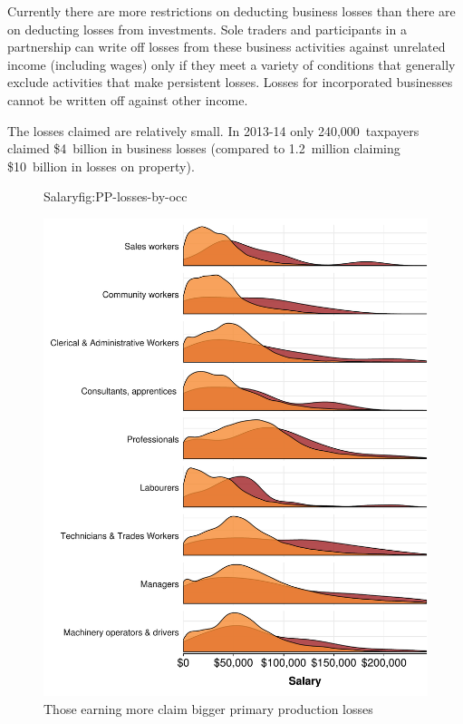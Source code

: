 \documentclass{grattan}\usepackage[]{graphicx}\usepackage[]{color}
\begin{document}
Currently there are more restrictions on deducting business losses than there are on deducting losses from investments. Sole traders and participants in a partnership can write off losses from these business activities against unrelated income (including wages) only if they meet a variety of conditions that generally exclude activities that make persistent losses.  Losses for incorporated businesses cannot be written off against other income. 





The losses claimed are relatively small. In 2013-14 only 240,000~taxpayers claimed \$4~billion in business losses (compared to 1.2~million claiming \$10~billion in losses on property).

\TBD{\dots}



\begin{figure}
\caption{Those earning more claim bigger primary production losses}{Salary}{fig:PP-losses-by-occ}










\includegraphics[width=\columnwidth]{CGT-NG-atlas//density-salary-by-PP-losses-1}
\end{figure}
\end{document}
